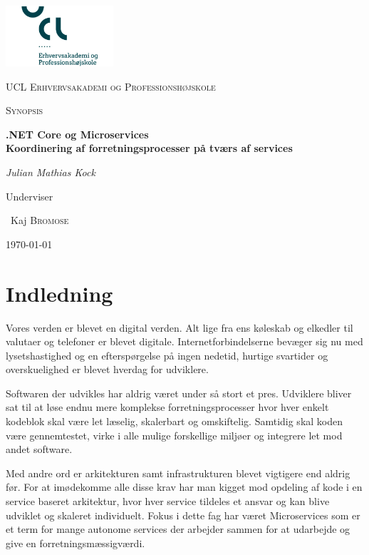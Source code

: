 \documentclass[12pt]{article} %
\begin{document}
\onehalfspacing
\begin{titlepage}
	\centering
	\includegraphics[width=0.3\textwidth]{ucllogo}\par\vspace{1cm}
	{\scshape\LARGE UCL Erhvervsakademi og Professionshøjskole \par}
	\vspace{1cm}
	{\scshape\Large Synopsis\par}
	\vspace{1.5cm}
	{\huge\bfseries .NET Core og Microservices \\ \large Koordinering af forretningsprocesser på tværs af services\par}
	\vspace{2cm}
	{\Large\itshape Julian Mathias Kock\par}
	\vfill
	Underviser \par
	~Kaj \textsc{Bromose}
	\vfill
	{\large \today\par}

\end{titlepage}

\tableofcontents
\newpage

\section{ Indledning }
Vores verden er blevet en digital verden. Alt lige fra ens køleskab og elkedler til valutaer og telefoner er blevet digitale. Internetforbindelserne bevæger sig nu med lysetshastighed og en efterspørgelse på ingen nedetid, hurtige svartider og overskuelighed er blevet hverdag for udviklere. 
\newline

\noindent
Softwaren der udvikles har aldrig været under så stort et pres. Udviklere bliver sat til at løse endnu mere komplekse forretningsprocesser hvor hver enkelt kodeblok skal være let læselig, skalerbart og omskiftelig. Samtidig skal koden være gennemtestet, virke i alle mulige forskellige miljøer og integrere let mod andet software. 
\newline

\noindent
Med andre ord er arkitekturen samt infrastrukturen blevet vigtigere end aldrig før. For at imødekomme alle disse krav har man kigget mod opdeling af kode i en service baseret arkitektur, hvor hver service tildeles et ansvar og kan blive udviklet og skaleret individuelt. Fokus i dette fag har været Microservices som er et term for mange autonome services der arbejder sammen for at udarbejde og give en forretningsmæssigværdi\cite{newman2015building}.
\newline
\end{document}

